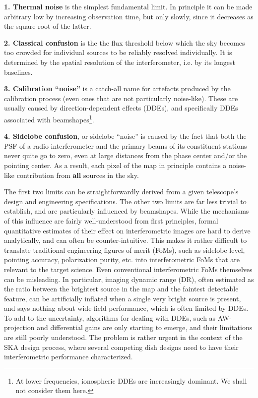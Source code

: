\documentclass{aa}
\begin{document}
{\bf 1. Thermal noise} is the simplest fundamental limit. In principle it can be made arbitrary low by increasing observation time, but only slowly, since it decreases as the square root of the latter.

{\bf 2. Classical confusion} is the the flux threshold below which the sky becomes too crowded for individual sources to be reliably resolved individually. It is determined by the spatial resolution of the interferometer, i.e. by its longest baselines.

{\bf 3. Calibration ``noise''} is a catch-all name for artefacts produced by the calibration process (even ones that are not particularly noise-like). These are usually caused by direction-dependent effects (DDEs), and specifically DDEs associated with beamshapes\footnote{At lower frequencies, ionospheric DDEs are increasingly dominant. We shall not consider them here.}.

{\bf 4. Sidelobe confusion}, or sidelobe ``noise'' is caused by the fact that both the PSF of a radio interferometer and the primary beams of its constituent stations never quite go to zero, even at large distances from 
the phase center and/or the pointing center. As a result, each pixel of the map in principle contains a noise-like contribution from {\bf all} sources in the sky.

The first two limits can be straightforwardly derived from a given telescope's design and engineering specifications. The other two limits are far less trivial to establish, and are particularly influenced by beamshapes. While the mechanisms of this influence are fairly well-understood from first principles, formal quantitative estimates of their effect on interferometric images are hard to derive analytically, and can often be counter-intuitive. This makes it rather difficult to translate traditional engineering figures of merit (FoMs), such as sidelobe level, pointing accuracy, polarization purity, etc. into interferometric FoMs that are relevant to the target science. Even conventional interferometric FoMs themselves can be misleading. In particular, imaging dynamic range (DR), often estimated as the ratio between the brightest source in the map and the faintest detectable feature, can be artificially inflated when a single very bright source is present, and says nothing about wide-field  performance, which is often limited by DDEs. To add to the uncertainty, algorithms for dealing with DDEs, such as AW-projection \citep{SB:imageplane} and differential gains \citep{RRIME3} are only starting to emerge, and their limitations are still poorly understood. The problem is rather urgent in the context of the SKA design process, where several competing dish designs need to have their interferometric performance characterized.
\end{document}
